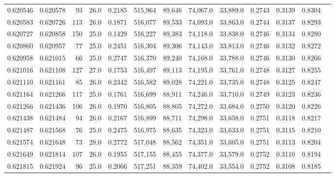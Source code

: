 \begin{tabular}{rrrrrrrrrrrrr}
0.620546 & 0.620578 &    93 & 26.0 &                                     0.2185 & 515,964 &  89,646 &  74,067.0 &  33,889.0 & 0.2743 & 0.3139 & 0.8304 \\
0.620583 & 0.620726 &   113 & 26.0 &                                     0.1871 & 516,077 &  89,533 &  74,093.0 &  33,863.0 & 0.2744 & 0.3137 & 0.8293 \\
0.620727 & 0.620858 &   150 & 25.0 &                                     0.1429 & 516,227 &  89,383 &  74,118.0 &  33,838.0 & 0.2746 & 0.3134 & 0.8280 \\
0.620860 & 0.620957 &    77 & 25.0 &                                     0.2451 & 516,304 &  89,306 &  74,143.0 &  33,813.0 & 0.2746 & 0.3132 & 0.8272 \\
0.620958 & 0.621015 &    66 & 25.0 &                                     0.2747 & 516,370 &  89,240 &  74,168.0 &  33,788.0 & 0.2746 & 0.3130 & 0.8266 \\
0.621016 & 0.621108 &   127 & 27.0 &                                     0.1753 & 516,497 &  89,113 &  74,195.0 &  33,761.0 & 0.2748 & 0.3127 & 0.8255 \\
0.621110 & 0.621161 &    85 & 26.0 &                                     0.2342 & 516,582 &  89,028 &  74,221.0 &  33,735.0 & 0.2748 & 0.3125 & 0.8247 \\
0.621164 & 0.621266 &   117 & 25.0 &                                     0.1761 & 516,699 &  88,911 &  74,246.0 &  33,710.0 & 0.2749 & 0.3123 & 0.8236 \\
0.621266 & 0.621436 &   106 & 26.0 &                                     0.1970 & 516,805 &  88,805 &  74,272.0 &  33,684.0 & 0.2750 & 0.3120 & 0.8226 \\
0.621438 & 0.621484 &    94 & 26.0 &                                     0.2167 & 516,899 &  88,711 &  74,298.0 &  33,658.0 & 0.2751 & 0.3118 & 0.8217 \\
0.621487 & 0.621568 &    76 & 25.0 &                                     0.2475 & 516,975 &  88,635 &  74,323.0 &  33,633.0 & 0.2751 & 0.3115 & 0.8210 \\
0.621574 & 0.621648 &    73 & 28.0 &                                     0.2772 & 517,048 &  88,562 &  74,351.0 &  33,605.0 & 0.2751 & 0.3113 & 0.8204 \\
0.621649 & 0.621814 &   107 & 26.0 &                                     0.1955 & 517,155 &  88,455 &  74,377.0 &  33,579.0 & 0.2752 & 0.3110 & 0.8194 \\
0.621815 & 0.621924 &    96 & 25.0 &                                     0.2066 & 517,251 &  88,359 &  74,402.0 &  33,554.0 & 0.2752 & 0.3108 & 0.8185 \\

\end{tabular}
